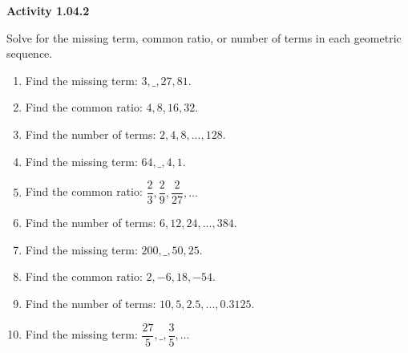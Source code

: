 \vspace{0.3ex}
\noindent\textbf{Activity 1.04.2}

\vspace{0.2ex}

Solve for the missing term, common ratio, or number of terms in each geometric sequence.
\begin{enumerate}
    \item Find the missing term: $3, \_ , 27, 81$.
    \item Find the common ratio: $4, 8, 16, 32$.
    \item Find the number of terms: $2, 4, 8, ..., 128$.
    \item Find the missing term: $64, \_, 4, 1$.
    \item Find the common ratio: $\dfrac{2}{3}, \dfrac{2}{9}, \dfrac{2}{27}, \dots$
    \item Find the number of terms: $6, 12, 24, ..., 384$.
    \item Find the missing term: $200, \_, 50, 25$.
    \item Find the common ratio: $2, -6, 18, -54$.
    \item Find the number of terms: $10, 5, 2.5, ..., 0.3125$.
    \item Find the missing term: $\dfrac{27}{5}, \_, \dfrac{3}{5}, \dots$
\end{enumerate}
